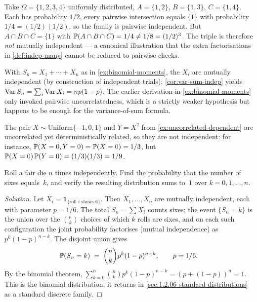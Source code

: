 \begin{example}
\label{ex:bernstein}
Take $\Omega = \{1, 2, 3, 4\}$ uniformly distributed,
$A = \{1, 2\}$, $B = \{1, 3\}$, $C = \{1, 4\}$. Each has probability
$1/2$, every pairwise intersection equals $\{1\}$ with probability
$1/4 = (1/2)(1/2)$, so the family is pairwise independent. But
$A \cap B \cap C = \{1\}$ with $\mathbb{P}(A \cap B \cap C) = 1/4 \neq 1/8 = (1/2)^3$.
The triple is therefore \emph{not} mutually independent — a
canonical illustration that the extra factorisations in
\cref{def:indep-many} cannot be reduced to pairwise checks.
\end{example}

\begin{example}
\label{ex:binomial-indep}
With $S_n = X_1 + \cdots + X_n$ as in \cref{ex:binomial-moments},
the $X_i$ are mutually independent (by construction of independent
trials); \cref{cor:var-sum-indep} yields
$\operatorname{Var} S_n = \sum_i \operatorname{Var} X_i = n p(1 - p)$. The earlier derivation in
\cref{ex:binomial-moments} only invoked pairwise uncorrelatedness,
which is a strictly weaker hypothesis but happens to be enough for
the variance-of-sum formula.
\end{example}

\begin{example}
\label{ex:uncorrelated-not-indep}
The pair $X \sim \mathrm{Uniform}\{-1, 0, 1\}$ and $Y = X^2$ from
\cref{ex:uncorrelated-dependent} are uncorrelated yet
deterministically related, so they are not independent: for instance,
$\mathbb{P}(X = 0, Y = 0) = \mathbb{P}(X = 0) = 1/3$, but
$\mathbb{P}(X = 0)\, \mathbb{P}(Y = 0) = (1/3)(1/3) = 1/9$.
\end{example}

\begin{problem}
\label{prob:exactly-k-out-of-n}
Roll a fair die $n$ times independently. Find the probability that the
number of sixes equals~$k$, and verify the resulting distribution sums
to~$1$ over $k = 0, 1, \dots, n$.
\end{problem}

\begin{proof}[Solution]
Let $X_i = \mathbf{1}_{\{\text{roll }i\text{ shows }6\}}$. Then
$X_1, \dots, X_n$ are mutually independent, each with parameter
$p = 1/6$. The total $S_n = \sum X_i$ counts sixes; the event
$\{S_n = k\}$ is the union over the $\binom{n}{k}$ choices of which
$k$ rolls are sixes, and on each such configuration the joint
probability factorises (mutual independence) as
$p^k (1-p)^{n-k}$. The disjoint union gives
\[
  \mathbb{P}(S_n = k) \;=\; \binom{n}{k} p^k (1 - p)^{n-k}, \qquad p = 1/6.
\]
By the binomial theorem,
$\sum_{k=0}^n \binom{n}{k} p^k (1-p)^{n-k} = (p + (1 - p))^n = 1$.
This is the binomial distribution; it returns in
\cref{sec:1.2.06-standard-distributions} as a standard discrete
family.
\end{proof}

